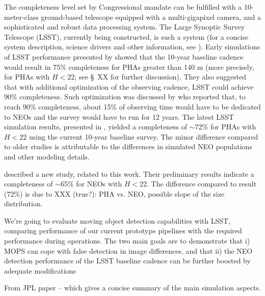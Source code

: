 The completeness level set by Congressional mandate can be fulfilled with a 10-meter-class ground-based
telescope equipped with a multi-gigapixel camera, and a sophisticated and robust data processing system. 
The Large Synoptic Survey Telescope (LSST), currently being constructed, is such a system (for a concise
system description, science drivers and other information, see \citep{LSSToverview}). Early simulations of 
LSST performance presented by \cite{IvezicNEO2007} showed that the 10-year baseline cadence would 
result in 75\% completeness for PHAs greater than 140 m (more precisely, for PHAs with $H<22$; see 
\S~XX for further discussion). They also suggested that with additional optimization of the observing cadence, 
LSST could achieve 90\% completeness. Such optimization was discussed by \cite{LSSToverview} who
reported that, to reach 90\% completeness, about 15\% of observing time would have to be dedicated to NEOs
and the survey would have to run for 12 years.  
The latest LSST simulation results, presented in \cite{JJI2016}, yielded a completeness of $\sim$72\% for
PHAs with $H<22$ using the current 10-year baseline survey. The minor difference compared to older
studies is attributable to the differences in simulated NEO populations and other modeling details. 


\cite{JPLstudy} described a new study, related to this work. Their preliminary results indicate a completeness
of $\sim$65\% for NEOs with $H<22$. The difference compared to \cite{JJI2016} result (72\%) is due 
to XXX (true?): PHA vs. NEO, possible slope of the size distribution. 


We're going to evaluate moving object detection capabilities with
LSST, comparing performance of our current prototype pipelines with 
the required performance during operations.  The two main goals are
to demonstrate that i) MOPS can cope with false detection in image differences,
and that ii) the NEO detection performance of the LSST baseline cadence can be
further boosted by adequate modifications 


From JPL paper -- which gives a concise summary of the main simulation aspects. 

